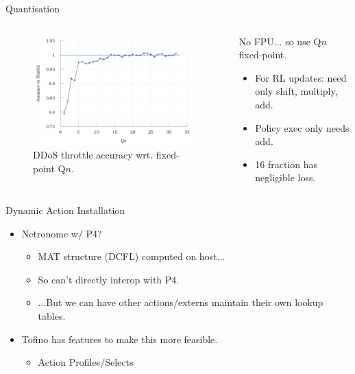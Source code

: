 \documentclass[aspectratio=169,xcolor={dvipsnames}
,handout
]{beamer}
\begin{document}
\begin{frame}{Quantisation}
	\begin{columns}
		\begin{column}{0.5\linewidth}
			\begin{figure}
				\includegraphics[width=0.9\linewidth]{../plots/build/marl-quant/accuracy-binary}
				\caption{DDoS throttle accuracy wrt. fixed-point Q$n$.}
			\end{figure}
		\end{column}
		\begin{column}{0.5\linewidth}
			No FPU... so use \alert{Q$n$ fixed-point}.
			\begin{itemize}
				\item For RL updates: need only shift, multiply, add.
				\item \alert{Policy exec only needs add}.
				\item \SI{16}{\bit} fraction has negligible loss.
			\end{itemize}
		\end{column}
	\end{columns}
\end{frame}

\begin{frame}{Dynamic Action Installation}
	\begin{itemize}
		\item Netronome w/ P4?
		\begin{itemize}
			\item MAT structure (DCFL) computed on host...
			\item So can't directly interop with P4.
			\item ...But we can have other actions/externs maintain their own lookup tables.
		\end{itemize}
		\item Tofino has features to make this more feasible.
		\begin{itemize}
			\item Action Profiles/Selects
		\end{itemize}
	\end{itemize}
\end{frame}
\end{document}

